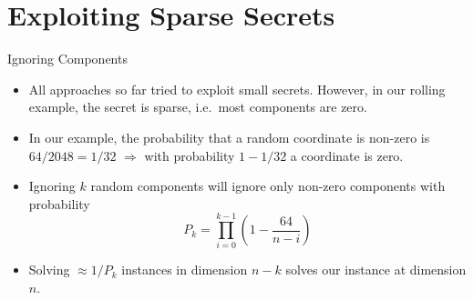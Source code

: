 \documentclass[10pt,compress]{beamer}
\begin{document}
\section{Exploiting Sparse Secrets}

\begin{frame}{Ignoring Components}

  \begin{itemize}
  \item All approaches so far tried to exploit \alert{small} secrets. However, in our rolling example, the secret is \alert{sparse}, i.e.\ most components are zero.
  \item In our example, the probability that a random coordinate is non-zero is $64/2048 = 1/32$ $\Rightarrow$ with probability $1-1/32$ a coordinate is zero.
  \item Ignoring $k$ random components will ignore only non-zero components with probability 
    \[P_{k} = \prod_{i=0}^{k-1} \left(   1- \frac{64} {n-i} \right)\]    
  \item  Solving $≈1/P_{k}$ instances in dimension $n-k$ solves our instance at dimension $n$.
  \end{itemize}

  \framebreak{}
  
  \begin{center}

  \end{center}  
\end{frame}
\end{document}
